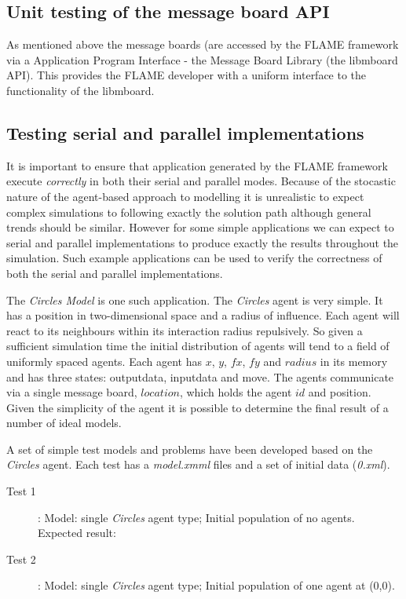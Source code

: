 \subsection{Unit testing of the message board API}
As mentioned above the message boards (are accessed by the FLAME framework via a Application Program Interface - the Message Board Library (the libmboard API). This provides the FLAME developer with a uniform interface to the functionality of the libmboard.
\subsection{Testing serial and parallel implementations}
It is important to ensure that application generated by the FLAME framework execute \textsl{correctly} in both their serial and parallel modes. Because of the stocastic nature of the agent-based approach to modelling it is unrealistic to expect complex simulations to following exactly the solution path although general trends should be similar. However for some simple applications we can expect to serial and parallel implementations to produce exactly the results throughout the simulation. Such example applications can be used to verify the correctness of both the serial and parallel implementations.

The \textsl{Circles Model} is one such application. The \textsl{Circles} agent is very simple. It has a position in two-dimensional space and a radius of influence. Each agent will react to its neighbours within its interaction radius repulsively. So given a sufficient simulation time the initial distribution of agents will tend to a field of uniformly spaced agents. Each agent has $x$, $y$, $fx$, $fy$ and $radius$ in its memory and has three states: outputdata, inputdata and move. The agents communicate via a single message board, $location$, which holds the agent $id$ and position. Given the simplicity of the agent it is possible to determine the final result of a number of ideal models.

A set of simple test models and problems have been developed based on the \textsl{Circles} agent. Each test has a \textsl{model.xmml} files and a set of initial data (\textsl{0.xml}).
\begin{description}
	\item [Test 1]: Model: single \textsl{Circles} agent type; Initial population of no agents. Expected result:
	\item [Test 2]: Model: single \textsl{Circles} agent type; Initial population of one agent at (0,0).
\end{description}

